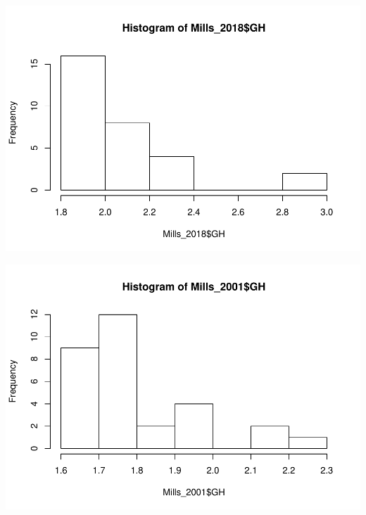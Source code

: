 \documentclass[12pt,]{article}
\newenvironment{Shaded}{\begin{snugshade}}{\end{snugshade}}
\newcommand{\DecValTok}[1]{\textcolor[rgb]{0.00,0.00,0.81}{#1}}
\newcommand{\KeywordTok}[1]{\textcolor[rgb]{0.13,0.29,0.53}{\textbf{#1}}}
\newcommand{\NormalTok}[1]{#1}
\newcommand{\OperatorTok}[1]{\textcolor[rgb]{0.81,0.36,0.00}{\textbf{#1}}}
\begin{document}
\includegraphics{Project_Template_files/figure-latex/T-Test-7.pdf}

\begin{Shaded}
\end{Shaded}

\includegraphics{Project_Template_files/figure-latex/T-Test-8.pdf}
\end{document}
